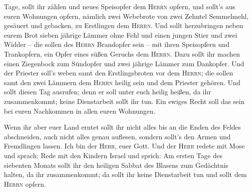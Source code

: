 Tage, sollt ihr zählen und neues Speisopfer dem \textsc{Herrn} opfern,
 und sollt's aus euren Wohnungen opfern, nämlich zwei
Webebrote von zwei Zehntel Semmelmehl, gesäuert und gebacken, zu
Erstlingen dem \textsc{Herrn}.  Und sollt herzubringen
neben eurem Brot sieben jährige Lämmer ohne Fehl und einen jungen Stier
und zwei Widder -- die sollen des \textsc{Herrn} Brandopfer sein -- mit
ihren Speisopfern und Trankopfern, ein Opfer eines süßen Geruchs dem
\textsc{Herrn}.  Dazu sollt ihr machen einen Ziegenbock
zum Sündopfer und zwei jährige Lämmer zum Dankopfer.  Und
der Priester soll's weben samt den Erstlingsbroten vor dem
\textsc{Herrn}; die sollen samt den zwei Lämmern dem \textsc{Herrn}
heilig sein und dem Priester gehören.  Und sollt diesen
Tag ausrufen; denn er soll unter euch heilig heißen, da ihr
zusammenkommt; keine Dienstarbeit sollt ihr tun. Ein ewiges Recht soll
das sein bei euren Nachkommen in allen euren Wohnungen.

 Wenn ihr aber euer Land erntet sollt ihr nicht alles bis
an die Enden des Feldes abschneiden, auch nicht alles genau auflesen,
sondern sollt's den Armen und Fremdlingen lassen. Ich bin der
\textsc{Herr}, euer Gott.  Und der \textsc{Herr} redete
mit Mose und sprach:  Rede mit den Kindern Israel und
sprich: Am ersten Tage des siebenten Monats sollt ihr den heiligen
Sabbat des Blasens zum Gedächtnis halten, da ihr zusammenkommt;
 da sollt ihr keine Dienstarbeit tun und sollt dem
\textsc{Herrn} opfern.

